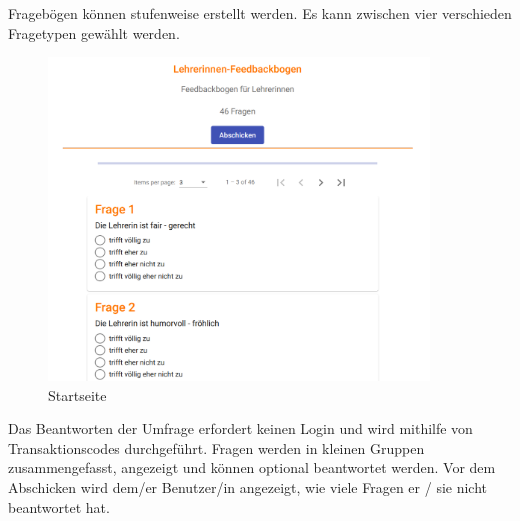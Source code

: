 Fragebögen können stufenweise erstellt werden. Es kann zwischen vier verschieden Fragetypen gewählt werden.

\begin{figure}[H]
    \includegraphics[width=0.9\textwidth]{pics/Ergebnis_Antworten.PNG}
    \centering
    \caption{Startseite}
\end{figure}

Das Beantworten der Umfrage erfordert keinen Login und wird mithilfe von Transaktionscodes durchgeführt. 
Fragen werden in kleinen Gruppen zusammengefasst, angezeigt und können optional beantwortet werden. 
Vor dem Abschicken wird dem/er Benutzer/in angezeigt, wie viele Fragen er / sie nicht beantwortet hat.
